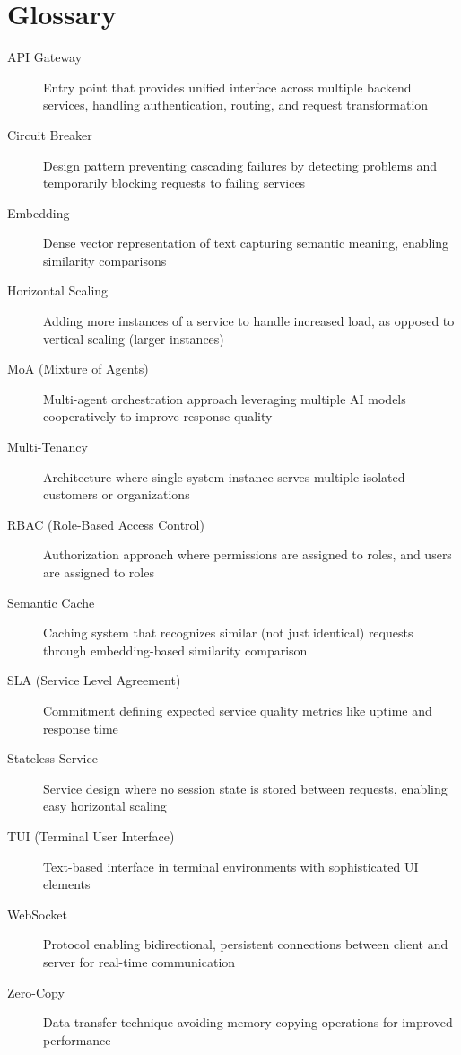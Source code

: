 \documentclass[12pt,a4paper,twoside]{report}
\begin{document}
\chapter{Glossary}

\begin{description}
    \item[API Gateway] Entry point that provides unified interface across multiple backend services, handling authentication, routing, and request transformation
    
    \item[Circuit Breaker] Design pattern preventing cascading failures by detecting problems and temporarily blocking requests to failing services
    
    \item[Embedding] Dense vector representation of text capturing semantic meaning, enabling similarity comparisons
    
    \item[Horizontal Scaling] Adding more instances of a service to handle increased load, as opposed to vertical scaling (larger instances)
    
    \item[MoA (Mixture of Agents)] Multi-agent orchestration approach leveraging multiple AI models cooperatively to improve response quality
    
    \item[Multi-Tenancy] Architecture where single system instance serves multiple isolated customers or organizations
    
    \item[RBAC (Role-Based Access Control)] Authorization approach where permissions are assigned to roles, and users are assigned to roles
    
    \item[Semantic Cache] Caching system that recognizes similar (not just identical) requests through embedding-based similarity comparison
    
    \item[SLA (Service Level Agreement)] Commitment defining expected service quality metrics like uptime and response time
    
    \item[Stateless Service] Service design where no session state is stored between requests, enabling easy horizontal scaling
    
    \item[TUI (Terminal User Interface)] Text-based interface in terminal environments with sophisticated UI elements
    
    \item[WebSocket] Protocol enabling bidirectional, persistent connections between client and server for real-time communication
    
    \item[Zero-Copy] Data transfer technique avoiding memory copying operations for improved performance
\end{description}
\end{document}

